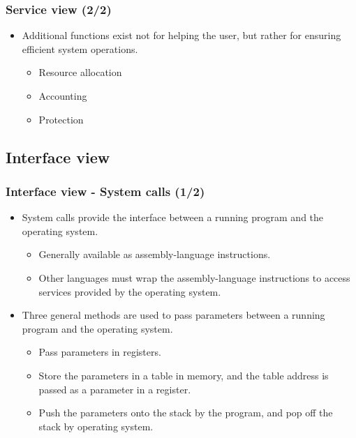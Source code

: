\documentclass[CJKutf8,xcolor=pdftex,dvipsnames,table]{beamer}
\begin{document}
\begin{CJK*}{UTF8}{song}
  \begin{frame}
    \frametitle{Service view (2/2)} \pause
    \begin{itemize}
    \item{Additional functions exist not for helping the user, but rather for ensuring efficient system operations.} \pause
      \begin{itemize}
      \item{Resource allocation} \pause
      \item{Accounting} \pause
      \item{Protection}
      \end{itemize}
    \end{itemize}
  \end{frame}

  \subsection{Interface view}

  \begin{frame}
    \frametitle{Interface view - System calls (1/2)} \pause
    \begin{itemize}
    \item{System calls provide the interface between a running program and the operating system.} \pause
      \begin{itemize}
      \item{Generally available as assembly-language instructions.} \pause
      \item{Other languages must wrap the assembly-language instructions to access services provided by the operating system.} \pause
      \end{itemize}
    \item{Three general methods are used to pass parameters between a running program and the operating system.} \pause
      \begin{itemize}
      \item{Pass parameters in registers.} \pause
      \item{Store the parameters in a table in memory, and the table address is passed as a parameter in a register.} \pause
      \item{Push the parameters onto the stack by the program, and pop off the stack by operating system.}
      \end{itemize}
    \end{itemize}
  \end{frame}


\end{CJK*}
\end{document}
